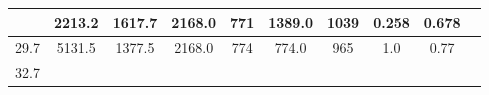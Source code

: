 \documentclass[a4paper,12pt]{article}
\begin{document}
\begin{longtable}{
     |
%    
    c|
%    
    c|
%    
    c|
%    
    c|
%    
    c|
%    
    c|
%    
    c|
%    
    c|
%    
    c|
%    
    c|
%    
    }
%        
        & 2213.2
%        

%        

%        
        & 1617.7
%        

%        

%        
        & 2168.0
%        

%        

%        
        & 771
%        

%        

%        
        & 1389.0
%        

%        

%        
        & 1039
%        

%        

%        
        & 0.258
%        

%        

%        
        & 0.678
%        

%        
        \\
        \hline

        

%        

%        
        29.7
%        

%        

%        
        & 5131.5
%        

%        

%        
        & 1377.5
%        

%        

%        
        & 2168.0
%        

%        

%        
        & 774
%        

%        

%        
        & 774.0
%        

%        

%        
        & 965
%        

%        

%        
        & 1.0
%        

%        

%        
        & 0.77
%        

%        
        \\
        \hline

        

%        

%        
        32.7
%        

%        


\end{longtable}
\end{document}
